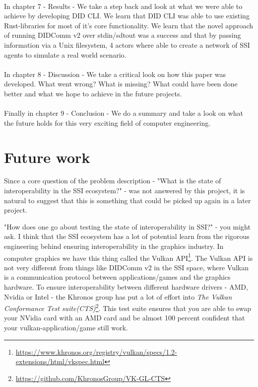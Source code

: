 \paragraph{}
In chapter 7 - Results - We take a step back and look at what we were able to achieve by developing DID CLI. We learn that DID CLI was able to use existing Rust-libraries for most of it's core functionality. We learn that the novel approach of running DIDComm v2 over stdin/sdtout was a success and that by passing information via a Unix filesystem, 4 actors where able to create a network of SSI agents to simulate a real world scenario.


\paragraph{}
In chapter 8 - Discussion - We take a critical look on how this paper was developed. What went wrong? What is missing? What could have been done better and what we hope to achieve in the future projects.


\paragraph{}
Finally in chapter 9 - Conclusion - We do a summary and take a look on what the future holds for this very exciting field of computer engineering.

\section{Future work}

Since a core question of the problem description - "What is the state of interoperability in the SSI ecosystem?" - was not answered by this project, it is natural to suggest that this is something that could be picked up again in a later project.

"How does one go about testing the state of interoperability in SSI?" - you might ask. I think that the SSI ecosystem has a lot of potential learn from the rigorous engineering behind ensuring interoperability in the graphics industry. In computer graphics we have this thing called the Vulkan API\footnote{\url{https://www.khronos.org/registry/vulkan/specs/1.2-extensions/html/vkspec.html}}. The Vulkan API is not very different from things like DIDComm v2 in the SSI space, where Vulkan is a communication protocol between applications/games and the graphics hardware. To ensure interoperability between different hardware drivers - AMD, Nvidia or Intel - the Khronos group has put a lot of effort into \textit{The Vulkan Conformance Test suite(CTS)}\footnote{\url{https://github.com/KhronosGroup/VK-GL-CTS}}. This test suite ensures that you are able to swap your NVidia card with an AMD card and be almost 100 percent confident that your vulkan-application/game still work.

